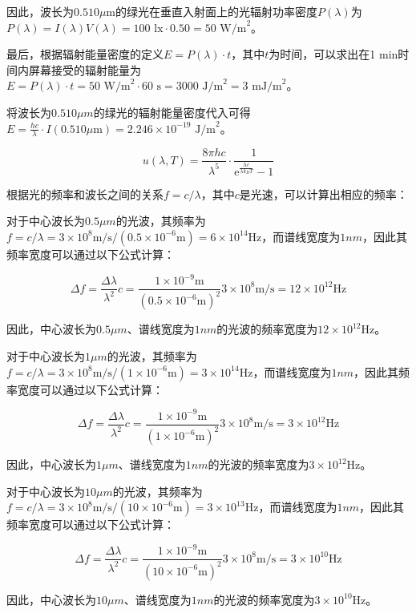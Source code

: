 \documentclass[12pt, a4paper, oneside]{article}
\begin{document}
\begin{spacing}{2.0}
因此，波长为$0.510\mu\text{m}$的绿光在垂直入射面上的光辐射功率密度$P(\lambda)$为$P(\lambda)=I(\lambda)V(\lambda)=100\text{ lx} \cdot 0.50=50\text{ W/m}^2$。

最后，根据辐射能量密度的定义$E=P(\lambda)\cdot t$，其中$t$为时间，可以求出在1 min时间内屏幕接受的辐射能量为$E=P(\lambda)\cdot t=50\text{ W/m}^2 \cdot 60\text{ s}=3000\text{ J/m}^2=3\text{ mJ/m}^2$。

将波长为$0.510 \mu m$的绿光的辐射能量密度代入可得$E = \frac{hc}{\lambda} \cdot I(0.510 \mu \text{m}) = 2.246 \times 10^{-19} \text{ J/m}^2$。


$$u(\lambda, T) = \frac{8\pi hc}{\lambda^5} \cdot \frac{1}{\mathrm{e}^{\frac{hc}{\lambda k_B T}}-1}$$




根据光的频率和波长之间的关系$f=c/\lambda$，其中$c$是光速，可以计算出相应的频率：

对于中心波长为$0.5 \mu m$的光波，其频率为$f=c/\lambda=3\times 10^8 \text{m/s} / (0.5\times 10^{-6} \text{m})=6\times 10^{14} \text{Hz}$，而谱线宽度为$1 nm$，因此其频率宽度可以通过以下公式计算：

$$\Delta f = \frac{\Delta \lambda}{\lambda^2}c = \frac{1\times 10^{-9} \text{m}}{(0.5\times 10^{-6} \text{m})^2}3\times 10^8 \text{m/s} = 12 \times 10^{12} \text{Hz}$$

因此，中心波长为$0.5 \mu m$、谱线宽度为$1 nm$的光波的频率宽度为$12 \times 10^{12} \text{Hz}$。

对于中心波长为$1 \mu m$的光波，其频率为$f=c/\lambda=3\times 10^8 \text{m/s} / (1\times 10^{-6} \text{m})=3\times 10^{14} \text{Hz}$，而谱线宽度为$1 nm$，因此其频率宽度可以通过以下公式计算：

$$\Delta f = \frac{\Delta \lambda}{\lambda^2}c = \frac{1\times 10^{-9} \text{m}}{(1\times 10^{-6} \text{m})^2}3\times 10^8 \text{m/s} = 3 \times 10^{12} \text{Hz}$$

因此，中心波长为$1 \mu m$、谱线宽度为$1 nm$的光波的频率宽度为$3 \times 10^{12} \text{Hz}$。

对于中心波长为$10 \mu m$的光波，其频率为$f=c/\lambda=3\times 10^8 \text{m/s} / (10\times 10^{-6} \text{m})=3\times 10^{13} \text{Hz}$，而谱线宽度为$1 nm$，因此其频率宽度可以通过以下公式计算：

$$\Delta f = \frac{\Delta \lambda}{\lambda^2}c = \frac{1\times 10^{-9} \text{m}}{(10\times 10^{-6} \text{m})^2}3\times 10^8 \text{m/s} = 3 \times 10^{10} \text{Hz}$$

因此，中心波长为$10 \mu m$、谱线宽度为$1 nm$的光波的频率宽度为$3 \times 10^{10} \text{Hz}$。













\end{spacing}{}



\end{document}
